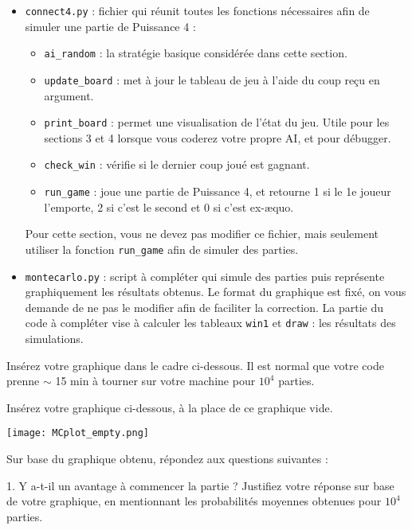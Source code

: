 \documentclass[11pt,answers]{exam}
\begin{document}
\begin{itemize}
    \item \texttt{connect4.py} : fichier qui réunit toutes les fonctions nécessaires afin de simuler une partie de Puissance 4 :
    \begin{itemize}
        \item \texttt{ai\_random} : la stratégie basique considérée dans cette section.
        \item \texttt{update\_board} : met à jour le tableau de jeu à l'aide du coup reçu en argument.
        \item \texttt{print\_board} : permet une visualisation de l'état du jeu. Utile pour les sections 3 et 4 lorsque vous coderez votre propre AI, et pour débugger.
        \item \texttt{check\_win} : vérifie si le dernier coup joué est gagnant.
        \item \texttt{run\_game} : joue une partie de Puissance 4, et retourne 1 si le 1e joueur l'emporte, 2 si c'est le second et 0 si c'est ex-æquo.
    \end{itemize}
    Pour cette section, vous ne devez pas modifier ce fichier, mais seulement utiliser la fonction \texttt{run\_game} afin de simuler des parties.
    \item \texttt{montecarlo.py} : script à compléter qui simule des parties puis représente graphiquement les résultats obtenus. Le format du graphique est fixé, on vous demande de ne pas le modifier afin de faciliter la correction. La partie du code à compléter vise à calculer les tableaux \texttt{win1} et \texttt{draw} : les résultats des simulations.
\end{itemize}

Insérez votre graphique dans le cadre ci-dessous. Il est normal que votre code prenne $\sim$ 15 min à tourner sur votre machine pour $10^4$ parties.

\begin{solutionbox}{100mm}
    Insérez votre graphique ci-dessous, à la place de ce graphique vide.

    \centering
    \texttt{[image: MCplot\_empty.png]}
\end{solutionbox}

Sur base du graphique obtenu, répondez aux questions suivantes :

\bigskip

1. Y a-t-il un avantage à commencer la partie ? Justifiez votre réponse sur base de votre graphique, en mentionnant les probabilités moyennes obtenues pour $10^4$ parties.
    
\end{document}
